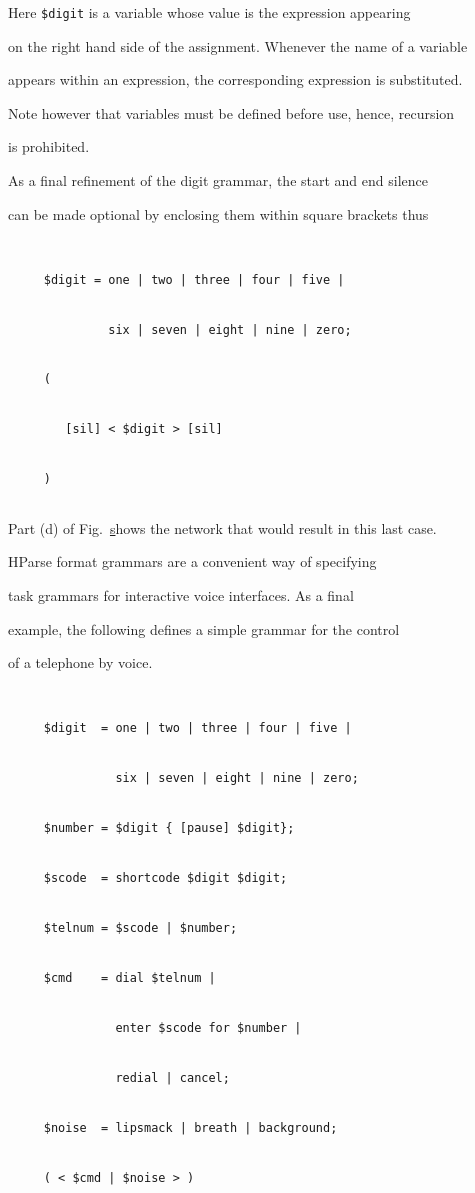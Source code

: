 Here \texttt{\$digit} is a variable whose value is the expression appearing


on the right hand side of the assignment.  Whenever the name of a variable


appears within an expression, the corresponding expression is substituted.


Note however that variables must be defined before use, hence, recursion


is prohibited.





As a final refinement of the digit grammar, the start and end silence


can be made optional by enclosing them within square brackets thus


\begin{verbatim}


     $digit = one | two | three | four | five |


              six | seven | eight | nine | zero;


     (


        [sil] < $digit > [sil]


     )


\end{verbatim}


Part (d) of Fig.~\href{f:digitnets}


shows the network that would result in this last case.





HParse format grammars are a convenient way of specifying 


task grammars for interactive voice interfaces.  As a final


example, the following defines a simple grammar for the control


of a telephone by voice.


\begin{verbatim}


     $digit  = one | two | three | four | five |


               six | seven | eight | nine | zero;


     $number = $digit { [pause] $digit};


     $scode  = shortcode $digit $digit;


     $telnum = $scode | $number;


     $cmd    = dial $telnum | 


               enter $scode for $number |


               redial | cancel;


     $noise  = lipsmack | breath | background;


     ( < $cmd | $noise > )


\end{verbatim}


